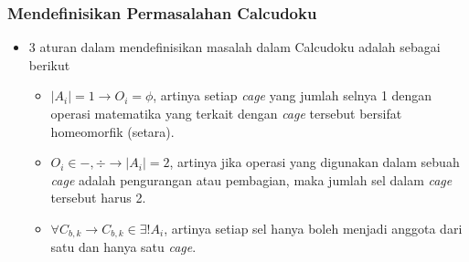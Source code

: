 \documentclass{beamer}
\begin{document}

\begin{frame}
\frametitle{Mendefinisikan Permasalahan Calcudoku}
\begin{itemize}
\item 3 aturan dalam mendefinisikan masalah dalam Calcudoku adalah sebagai berikut
	\begin{itemize}
	\item \begin{math}|A_i| = 1 \rightarrow O_i = \phi\end{math}, artinya setiap \textit{cage} yang jumlah selnya 1 dengan operasi matematika yang terkait dengan \textit{cage} tersebut bersifat homeomorfik (setara).
	\item \begin{math}O_i \in {-, \div} \rightarrow |A_i| = 2\end{math}, artinya jika operasi yang digunakan dalam sebuah \textit{cage} adalah pengurangan atau pembagian, maka jumlah sel dalam \textit{cage} tersebut harus 2.
	\item \begin{math}\forall C_{b,k} \rightarrow C_{b,k} \in \exists! A_i\end{math}, artinya setiap sel hanya boleh menjadi anggota dari satu dan hanya satu \textit{cage}.
	\end{itemize}
\end{itemize}
\end{frame}
\end{document}
